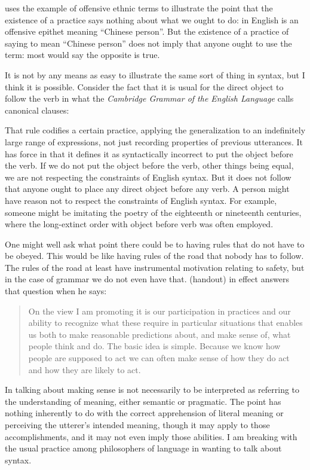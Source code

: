 \documentclass[output=paper]{langscibook}
\begin{document}
{\Millar} uses the example of offensive ethnic terms to illustrate the point that the existence of a practice says nothing about what we ought to do:  in English is an offensive epithet meaning ``Chinese person''. But the existence of a practice of saying  to mean ``Chinese person'' does not imply that anyone ought to use the term: most would say the opposite is true.

It is not by any means as easy to illustrate the same sort of thing in syntax, but I think it is possible.  Consider the fact that it is usual for the direct object to follow the verb in what the \emph{Cambridge Grammar of the English Language} \citep{HuddlestonePullum2008} calls canonical clauses:

\ea
{}
\z
\z

That rule codifies a certain practice, applying the generalization to an indefinitely large range of expressions, not just recording properties of previous utterances.  It has  force in that it defines it as syntactically incorrect to put the object before the verb.  If we do not put the object before the verb, other things being equal, we are not respecting the constraints of English syntax.  But it does not follow that anyone ought to place any direct object before any verb.  A person might have reason not to respect the constraints of English syntax.  For example, someone might be imitating the poetry of the eighteenth or nineteenth centuries, where the long-extinct order with object before verb was often employed.

One might well ask what point there could be to having rules that do not have to be obeyed.  This would be like having rules of the road that nobody has to follow.  The rules of the road at least have instrumental motivation relating to safety, but in the case of grammar we do not even have that.  {\Millar} (handout) in effect answers that question when he says:

\begin{quote}
On the view I am promoting it is our participation in practices and our ability to recognize what these require in particular situations that enables us both to make reasonable predictions about, and make sense of, what people think and do. The basic idea is simple. Because we know how people are supposed to act we can often make sense of how they do act and how they are likely to act. 
\end{quote} 
In talking about making sense {\Millar} is not necessarily to be interpreted as referring to the understanding of meaning, either semantic or pragmatic. The point has nothing inherently to do with the correct apprehension of literal meaning or perceiving the utterer's intended meaning, though it may apply to those accomplishments, and it may not even imply those abilities.  I am breaking with the usual practice among philosophers of language in wanting to talk about syntax.
\end{document}
